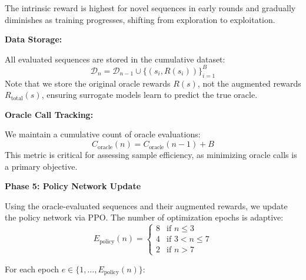\documentclass[conference]{IEEEtran}
\begin{document}
The intrinsic reward is highest for novel sequences in early rounds and gradually diminishes as training progresses, shifting from exploration to exploitation.

\textbf{Data Storage:}

All evaluated sequences are stored in the cumulative dataset:
\begin{equation}
\mathcal{D}_n = \mathcal{D}_{n-1} \cup \{(s_i, R(s_i))\}_{i=1}^{B}
\end{equation}
Note that we store the original oracle rewards $R(s)$, not the augmented rewards $R_{\text{total}}(s)$, ensuring surrogate models learn to predict the true oracle.

\textbf{Oracle Call Tracking:}

We maintain a cumulative count of oracle evaluations:
\begin{equation}
C_{\text{oracle}}(n) = C_{\text{oracle}}(n-1) + B
\end{equation}
This metric is critical for assessing sample efficiency, as minimizing oracle calls is a primary objective.

\textbf{Phase 5: Policy Network Update}

Using the oracle-evaluated sequences and their augmented rewards, we update the policy network via PPO. The number of optimization epochs is adaptive:
\begin{equation}
E_{\text{policy}}(n) = \begin{cases}
8 & \text{if } n \leq 3 \\
4 & \text{if } 3 < n \leq 7 \\
2 & \text{if } n > 7
\end{cases}
\end{equation}

For each epoch $e \in \{1, \ldots, E_{\text{policy}}(n)\}$:
\end{document}
